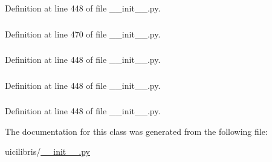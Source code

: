 \-Definition at line 448 of file \-\_\-\-\_\-init\-\_\-\-\_\-.\-py.

\hypertarget{classuicilibris_1_1latexComp_ad99271f86b470be24fedfdddd728374d}{
\subsubsection[{log\-Output}]{}}\label{classuicilibris_1_1latexComp_ad99271f86b470be24fedfdddd728374d}


\-Definition at line 470 of file \-\_\-\-\_\-init\-\_\-\-\_\-.\-py.

\hypertarget{classuicilibris_1_1latexComp_a0b4666c9c550dcb6d7e34f83650efd09}{
\subsubsection[{pdf\-File\-Name}]{}}\label{classuicilibris_1_1latexComp_a0b4666c9c550dcb6d7e34f83650efd09}


\-Definition at line 448 of file \-\_\-\-\_\-init\-\_\-\-\_\-.\-py.

\hypertarget{classuicilibris_1_1latexComp_ac4c4c87e8652870b3f427348f00b054c}{
\subsubsection[{tex\-Filename}]{}}\label{classuicilibris_1_1latexComp_ac4c4c87e8652870b3f427348f00b054c}


\-Definition at line 448 of file \-\_\-\-\_\-init\-\_\-\-\_\-.\-py.

\hypertarget{classuicilibris_1_1latexComp_a5b5d686a0230cb74c85c8ed2b8f2a60d}{
\subsubsection[{tmpdir}]{}}\label{classuicilibris_1_1latexComp_a5b5d686a0230cb74c85c8ed2b8f2a60d}


\-Definition at line 448 of file \-\_\-\-\_\-init\-\_\-\-\_\-.\-py.



\-The documentation for this class was generated from the following file\-:\begin{DoxyCompactItemize}
\item 
uicilibris/\hyperlink{____init_____8py}{\-\_\-\-\_\-init\-\_\-\-\_\-.\-py}\end{DoxyCompactItemize}
